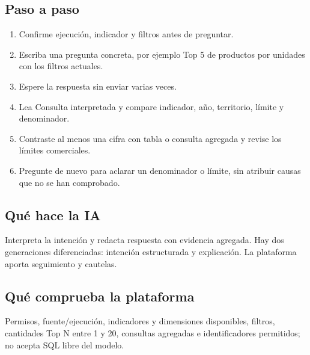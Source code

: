 \subsection{Paso a paso}
\begin{enumerate}
\item Confirme ejecución, indicador y filtros antes de preguntar.\par\nopagebreak[4]
\item Escriba una pregunta concreta, por ejemplo Top 5 de productos por unidades con los filtros actuales.\par\nopagebreak[4]
\item Espere la respuesta sin enviar varias veces.\par\nopagebreak[4]
\item Lea Consulta interpretada y compare indicador, año, territorio, límite y denominador.\par\nopagebreak[4]
\item Contraste al menos una cifra con tabla o consulta agregada y revise los límites comerciales.\par\nopagebreak[4]
\item Pregunte de nuevo para aclarar un denominador o límite, sin atribuir causas que no se han comprobado.\par\nopagebreak[4]
\end{enumerate}
\subsection{Qué hace la IA}
Interpreta la intención y redacta respuesta con evidencia agregada. Hay dos generaciones diferenciadas: intención estructurada y explicación. La plataforma aporta seguimiento y cautelas.

\subsection{Qué comprueba la plataforma}
Permisos, fuente/ejecución, indicadores y dimensiones disponibles, filtros, cantidades Top N entre 1 y 20, consultas agregadas e identificadores permitidos; no acepta SQL libre del modelo.

